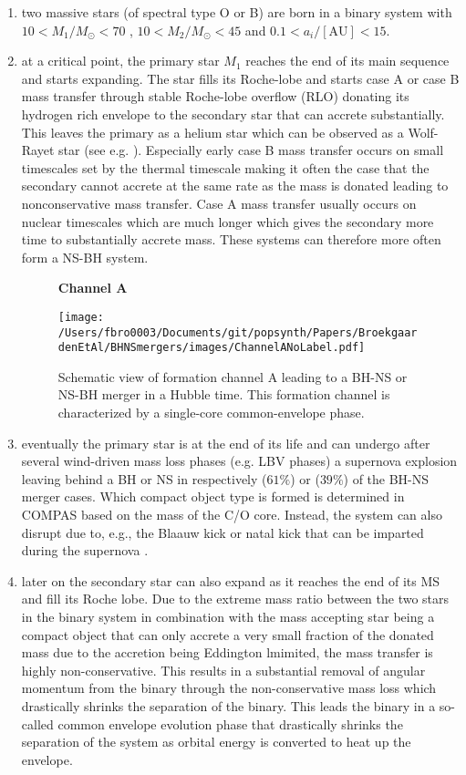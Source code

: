 \documentclass[a4paper,fleqn,usenatbib,useAMS,usedcolumn]{mnras}
\begin{document}
\begin{enumerate}
	\item two massive stars (of spectral type O or B) are born in a binary system with $10 < M_1 / M_{\odot} < 70$ ,   $10 < M_2 / M_{\odot} < 45$ and  $0.1 < a_i / \mathrm{[AU]} < 15 $. 
	\item at a critical point, the primary star $M_1$ reaches the end of its main sequence and starts expanding. The star fills its Roche-lobe and starts  case A or case B mass transfer through stable Roche-lobe overflow (RLO) donating its hydrogen rich envelope to the secondary star that can accrete substantially. This leaves the primary as a helium star which can be observed as a Wolf-Rayet star (see e.g. \citealt{crowther2007physical,langer1994towards}). Especially early case B mass transfer occurs on small timescales set by the thermal timescale making it often the case that the secondary cannot accrete at the same rate as the mass is donated leading to nonconservative mass transfer. Case A mass transfer usually occurs on nuclear timescales which are much longer which gives the secondary more time to substantially accrete mass. These systems can therefore more often form a NS-BH system.   
\begin{figure}
\begin{center}
\Large {\textbf{\hspace{-1cm}Channel A }}\par\medskip
	\texttt{[image: /Users/fbro0003/Documents/git/popsynth/Papers/BroekgaardenEtAl/BHNSmergers/images/ChannelANoLabel.pdf]}
    \caption{Schematic view of formation channel
A leading to a BH-NS or NS-BH merger in a Hubble time. This
formation channel is characterized by a single-core common-envelope phase. }
    \label{fig:subchannelsMainA}
\end{center}
\end{figure}
%
	\item eventually the primary star is at the end of its life and  can undergo after several wind-driven mass loss phases (e.g. LBV phases) a supernova explosion leaving behind a BH  or NS   in respectively ($61\%$) or ($39\%$) of the BH-NS merger cases. Which compact object type is formed is determined in COMPAS based on the mass of the C/O core.   Instead, the system can also disrupt due to, e.g., the Blaauw kick or natal kick that can be imparted during the supernova \citep{1961BAN....15..265B,1998A&A...330.1047T}. 
	\item later on the secondary star can also  expand as it reaches the end of its MS and fill its Roche lobe. Due to the extreme mass ratio between the two stars in the binary system in combination with the mass accepting star being a compact object that can only accrete a very small fraction of the donated mass due to the accretion being Eddington lmimited, the mass transfer is highly non-conservative. This results in a substantial removal of angular momentum from the binary through the non-conservative mass loss which drastically shrinks the separation of the binary. This leads the binary in a so-called common envelope evolution phase that drastically  shrinks the separation of the system as orbital energy is converted to heat up the envelope.

\end{enumerate}
\end{document}
